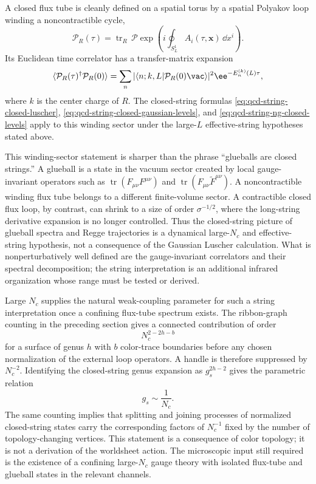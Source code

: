 A closed flux tube is cleanly defined on a spatial torus by a spatial
Polyakov loop winding a noncontractible cycle,
\[
  \mathcal P_R(\tau)
  =
  \operatorname{tr}_R\,
  \mathcal P\exp\left(i\oint_{S^1_L}A_i(\tau,\mathbf x)\,\dd x^i\right).
\]
Its Euclidean time correlator has a transfer-matrix expansion
\[
  \langle \mathcal P_R(\tau)^\dagger\mathcal P_R(0)\rangle
  =
  \sum_n
  |\langle n;k,L|\mathcal P_R(0)\vac\rangle|^2
  \ee^{-E_n^{(k)}(L)\tau},
\]
where \(k\) is the center charge of \(R\).  The closed-string formulas
\eqref{eq:qcd-string-closed-luscher},
\eqref{eq:qcd-string-closed-gaussian-levels}, and
\eqref{eq:qcd-string-ng-closed-levels} apply to this winding sector under the
large-\(L\) effective-string hypotheses stated above.

This winding-sector statement is sharper than the phrase ``glueballs are
closed strings.''  A glueball is a state in the vacuum sector created by local
gauge-invariant operators such as
\(\operatorname{tr}(F_{\mu\nu}F^{\mu\nu})\) and
\(\operatorname{tr}(F_{\mu\nu}\widetilde F^{\mu\nu})\).  A noncontractible
winding flux tube belongs to a different finite-volume sector.  A
contractible closed flux loop, by contrast, can shrink to a size of order
\(\sigma^{-1/2}\), where the long-string derivative expansion is no longer
controlled.  Thus the closed-string picture of glueball spectra and Regge
trajectories is a dynamical large-\(N_c\) and effective-string hypothesis, not
a consequence of the Gaussian Luscher calculation.  What is nonperturbatively
well defined are the gauge-invariant correlators and their spectral
decomposition; the string interpretation is an additional infrared
organization whose range must be tested or derived.

Large \(N_c\) supplies the natural weak-coupling parameter for such a string
interpretation once a confining flux-tube spectrum exists.  The ribbon-graph
counting in the preceding section gives a connected contribution of order
\[
  N_c^{2-2h-b}
\]
for a surface of genus \(h\) with \(b\) color-trace boundaries before any
chosen normalization of the external loop operators.  A handle is therefore
suppressed by \(N_c^{-2}\).  Identifying the closed-string genus expansion as
\(g_s^{2h-2}\) gives the parametric relation
\[
  g_s\sim \frac1{N_c}.
\]
The same counting implies that splitting and joining processes of normalized
closed-string states carry the corresponding factors of \(N_c^{-1}\) fixed by
the number of topology-changing vertices.  This statement is a consequence of
color topology; it is not a derivation of the worldsheet action.  The
microscopic input still required is the existence of a
confining large-\(N_c\) gauge theory with isolated flux-tube and glueball
states in the relevant channels.

